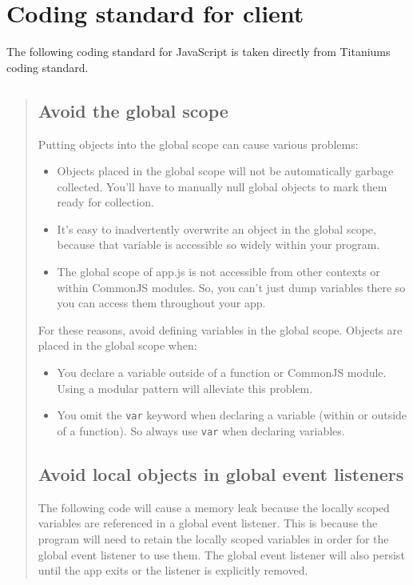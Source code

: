 \documentclass[11pt]{book}
\begin{document}
\section{Coding standard for client}
The following coding standard for JavaScript is taken directly from Titaniums coding standard\cite{titaniumCodingStandard}.

\begin{quotation}\noindent
\subsection{Avoid the global scope}
Putting objects into the global scope can cause various problems:
\begin{itemize}
    \item Objects placed in the global scope will not be automatically garbage collected. You'll have to manually null global objects to mark them ready for collection.
    \item It's easy to inadvertently overwrite an object in the global scope, because that variable is accessible so widely within your program.
    \item The global scope of app.js is not accessible from other contexts or within CommonJS modules. So, you can't just dump variables there so you can access them throughout your app.
\end{itemize}

For these reasons, avoid defining variables in the global scope. Objects are placed in the global scope when:
\begin{itemize}
    \item You declare a variable outside of a function or CommonJS module. Using a modular pattern will alleviate this problem.
    \item You omit the \texttt{var} keyword when declaring a variable (within or outside of a function). So always use \texttt{var} when declaring variables.
\end{itemize}

\subsection{Avoid local objects in global event listeners}
The following code will cause a memory leak because the locally scoped variables are referenced in a global event listener. This is because the program will need to retain the locally scoped variables in order for the global event listener to use them. The global event listener will also persist until the app exits or the listener is explicitly removed.


\end{quotation}
\end{document}
